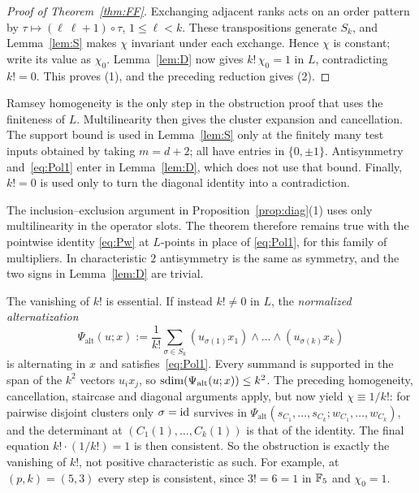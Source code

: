\begin{proof}[Proof of Theorem~\ref{thm:FF}]
Exchanging adjacent ranks acts on an order pattern by
$\tau\mapsto(\ell\ \ell{+}1)\circ\tau$, $1\le\ell<k$. These transpositions generate $S_k$, and Lemma~\ref{lem:S}
makes $\chi$ invariant under each exchange. Hence $\chi$ is constant; write its value as $\chi_0$.
Lemma~\ref{lem:D} now gives $k!\,\chi_0=1$ in $L$, contradicting $k!=0$. This proves (1), and the preceding reduction
gives (2).
\end{proof}

\begin{remark}\label{rem:FFhyp}
Ramsey homogeneity is the only step in the obstruction proof that uses the finiteness of $L$.
Multilinearity then gives the cluster expansion and cancellation. The support bound is used in Lemma~\ref{lem:S}
only at the finitely many test inputs obtained by taking $m=d+2$; all have entries in $\{0,\pm1\}$.
Antisymmetry and~\eqref{eq:Pol1} enter in Lemma~\ref{lem:D}, which does not use that bound. Finally, $k!=0$ is used only
to turn the diagonal identity into a contradiction.

The inclusion--exclusion argument in Proposition~\ref{prop:diag}(1) uses only multilinearity in the
operator slots. The theorem therefore remains true with the pointwise identity \eqref{eq:Pw} at $L$\nobreakdash-points in place of
\eqref{eq:Pol1}, for this family of multipliers. In characteristic $2$ antisymmetry is the same as symmetry, and the two signs in
Lemma~\ref{lem:D} are trivial.
\end{remark}

\begin{remark}\label{rem:FFunit}
The vanishing of $k!$ is essential. If instead $k!\ne0$ in $L$, the \emph{normalized alternatization}
\[
\Psi_{\mathrm{alt}}(u;x):=\frac1{k!}\sum_{\sigma\in S_k}(u_{\sigma(1)}x_1)\wedge\dots\wedge(u_{\sigma(k)}x_k)
\]
is alternating in $x$ and satisfies~\eqref{eq:Pol1}. Every summand is supported in the span of the $k^2$ vectors
$u_ix_j$, so $\operatorname{sdim}(\Psi_{\mathrm{alt}}(u;x))\le k^2$. The preceding homogeneity, cancellation, staircase and diagonal
arguments apply, but now yield $\chi\equiv1/k!$: for pairwise disjoint clusters only $\sigma=\mathrm{id}$
survives in $\Psi_{\mathrm{alt}}(s_{C_1},\dots,s_{C_k};w_{C_1},\dots,w_{C_k})$, and the determinant at
$(C_1(1),\dots,C_k(1))$ is that of the identity. The final equation $k!\cdot(1/k!)=1$ is then consistent. So the
obstruction is exactly the vanishing of $k!$, not positive characteristic as such. For example, at $(p,k)=(5,3)$ every
step is consistent, since $3!=6=1$ in $\mathbb F_5$ and $\chi_0=1$.
\end{remark}
